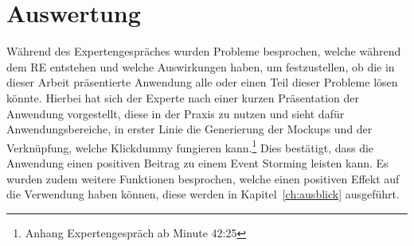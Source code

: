 \section{Auswertung}\label{sec:auswertung}
Während des Expertengespräches wurden Probleme besprochen, welche während dem \ac{RE} entstehen und welche Auswirkungen haben, um festzustellen,
ob die in dieser Arbeit präsentierte Anwendung alle oder einen Teil dieser Probleme lösen könnte.
Hierbei hat sich der Experte nach einer kurzen Präsentation der Anwendung vorgestellt, diese in der Praxis zu nutzen und sieht dafür
Anwendungsbereiche, in erster Linie die Generierung der Mockups und der Verknüpfung, welche Klickdummy fungieren kann.\footnote{Anhang Expertengespräch ab Minute 42:25}
Dies bestätigt, dass die Anwendung einen positiven Beitrag zu einem Event Storming leisten kann.
Es wurden zudem weitere Funktionen besprochen, welche einen positiven Effekt auf die Verwendung haben können, diese werden in Kapitel~\ref{ch:ausblick} ausgeführt.
